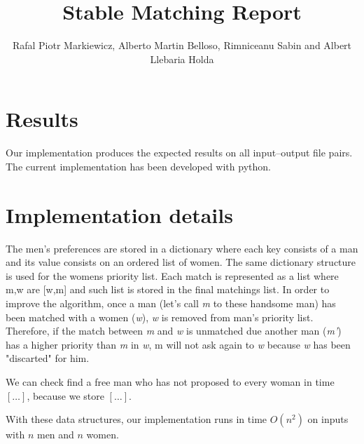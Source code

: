 \documentclass{tufte-handout}
\title{Stable Matching Report}
\author{Rafal Piotr Markiewicz, Alberto Martin Belloso, Rimniceanu Sabin and Albert Llebaria Holda}
\begin{document}
  \maketitle

  \section{Results}

  Our implementation produces the expected results on all input--output file pairs. The current implementation has been developed with python. 
 

  \section{Implementation details}

  	The men's preferences are stored in a dictionary where each key consists of a man and its value consists on an ordered list of women.  %
	The same dictionary structure is used for the womens priority list. Each match is represented as a list where m,w are [w,m] and such list is stored in the final matchings list. In order to improve the algorithm, once a man (let's call \textit{m} to these handsome man) has been matched with a women (\textit{w}), \textit{w} is removed from man's priority list. Therefore, if the match between \textit{m} and \textit{w} is unmatched due another man (\textit{m'}) has a higher priority than \textit{m} in \textit{w}, m will not ask again to \textit{w} because \textit{w} has been "discarted" for him. 
	
	
	We can check find a free man who has not proposed to every woman in time $[\ldots]$, because we store $[\ldots]$.
	
	With these data structures, our implementation runs in time $O(n^2)$ %
	 on inputs with $n$ men and $n$ women.
\end{document}
